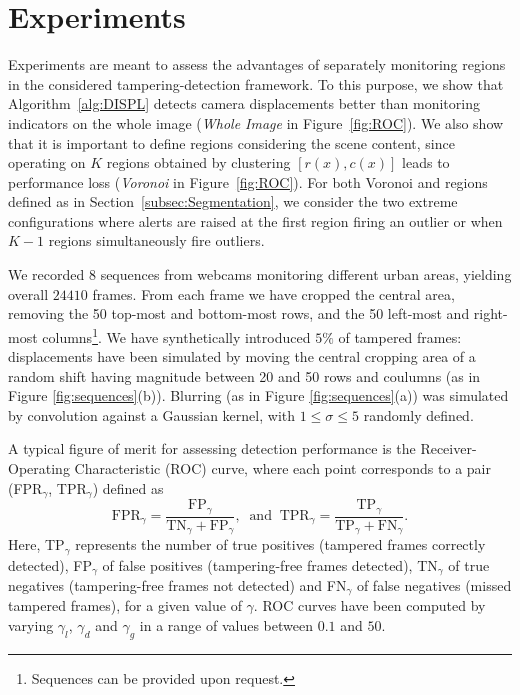 \documentclass{llncs}
\newcommand{\gi}[1]{{\textcolor{red}{[\small \textbf{Giacomo}: #1]}}}
\begin{document}
\section{Experiments}\label{sec:experiments}
Experiments are meant to assess the advantages of separately monitoring regions in the considered tampering-detection framework. To this purpose, we show that Algorithm~\ref{alg:DISPL} detects camera displacements better than monitoring indicators on the whole image (\emph{Whole Image} in Figure~\ref{fig:ROC}). We also show that it is important to define regions considering the scene content, since operating on $K$ regions obtained by clustering $[r(x), c(x)]$ leads to performance loss (\emph{Voronoi} in Figure~\ref{fig:ROC}). For both Voronoi and regions defined as in Section~\ref{subsec:Segmentation}, we consider the two extreme configurations where alerts are raised at the first region firing an outlier or when $K-1$ regions simultaneously fire outliers.

We recorded $8$ sequences from webcams monitoring different urban areas, yielding overall $24410$ frames. From each frame we have cropped the central area, removing the 50 top-most and bottom-most rows, and the 50 left-most and right-most columns\footnote{Sequences can be provided upon request.}. We have synthetically introduced $5\%$ of tampered frames: displacements have been simulated by moving the central cropping area of a random shift having magnitude between 20 and 50 rows and coulumns (as in Figure \ref{fig:sequences}(b)). Blurring  (as in Figure \ref{fig:sequences}(a)) was simulated by convolution against a Gaussian kernel, with $1\leq\sigma\leq5$ randomly defined. 

A typical figure of merit for assessing detection performance is the Receiver-Operating Characteristic (ROC) curve, where each point corresponds to a pair (FPR$_\gamma$, TPR$_\gamma$) defined as
%
\[\text{FPR}_\gamma = \frac{\text{FP}_\gamma}{\text{TN}_\gamma+\text{FP}_\gamma}, \ \text{ and } \ \text{TPR}_\gamma=\frac{\text{TP}_\gamma}{\text{TP}_\gamma+\text{FN}_\gamma}.\]
%
Here, TP$_\gamma$ represents the number of true positives (tampered frames correctly detected), FP$_\gamma$ of false positives (tampering-free frames detected), TN$_\gamma$ of true negatives (tampering-free frames not detected) and FN$_\gamma$ of false negatives (missed tampered frames), for a given value of $\gamma$. ROC curves have been computed by varying $\gamma_l$, $\gamma_d$ and $\gamma_g$ in a range of values between $0.1$ and $50$. 
\vspace{-0.3cm}
\end{document}
